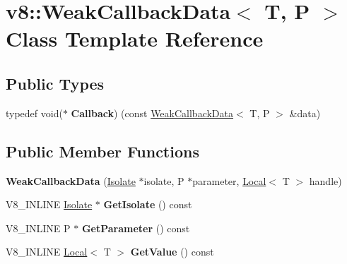 \hypertarget{classv8_1_1_weak_callback_data}{}\section{v8\+:\+:Weak\+Callback\+Data$<$ T, P $>$ Class Template Reference}
\label{classv8_1_1_weak_callback_data}
\subsection*{Public Types}
\begin{DoxyCompactItemize}
\item 
typedef void($\ast$ {\bfseries Callback}) (const \hyperlink{classv8_1_1_weak_callback_data}{Weak\+Callback\+Data}$<$ T, P $>$ \&data)\hypertarget{classv8_1_1_weak_callback_data_a08a29122f54c663fc2442d8f42c08ac2}{}\label{classv8_1_1_weak_callback_data_a08a29122f54c663fc2442d8f42c08ac2}

\end{DoxyCompactItemize}
\subsection*{Public Member Functions}
\begin{DoxyCompactItemize}
\item 
{\bfseries Weak\+Callback\+Data} (\hyperlink{classv8_1_1_isolate}{Isolate} $\ast$isolate, P $\ast$parameter, \hyperlink{classv8_1_1_local}{Local}$<$ T $>$ handle)\hypertarget{classv8_1_1_weak_callback_data_a804314135aa731fcab6d57aafddd26d3}{}\label{classv8_1_1_weak_callback_data_a804314135aa731fcab6d57aafddd26d3}

\item 
V8\+\_\+\+I\+N\+L\+I\+NE \hyperlink{classv8_1_1_isolate}{Isolate} $\ast$ {\bfseries Get\+Isolate} () const \hypertarget{classv8_1_1_weak_callback_data_a499a971756182b5b52c28e506339c6b9}{}\label{classv8_1_1_weak_callback_data_a499a971756182b5b52c28e506339c6b9}

\item 
V8\+\_\+\+I\+N\+L\+I\+NE P $\ast$ {\bfseries Get\+Parameter} () const \hypertarget{classv8_1_1_weak_callback_data_a96ce7e1fbbfd56d0709225623517ff17}{}\label{classv8_1_1_weak_callback_data_a96ce7e1fbbfd56d0709225623517ff17}

\item 
V8\+\_\+\+I\+N\+L\+I\+NE \hyperlink{classv8_1_1_local}{Local}$<$ T $>$ {\bfseries Get\+Value} () const \hypertarget{classv8_1_1_weak_callback_data_a0e8fcf0091132c96d548ac319284710a}{}\label{classv8_1_1_weak_callback_data_a0e8fcf0091132c96d548ac319284710a}

\end{DoxyCompactItemize}
